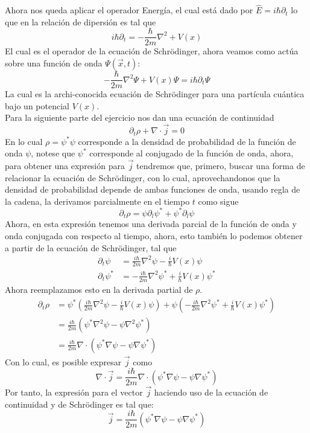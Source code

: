 \documentclass[../main_ej.tex]{subfiles}
\begin{document}
Ahora nos queda aplicar el operador Energía, el cual está dado por $\hat{E}=i\hbar\partial_t$ lo que en la relación de dipersión es tal que
\begin{equation*}
  i\hbar \partial_t = -\frac{\hbar}{2m}\nabla^2 + V(x)
\end{equation*}
El cual es el operador de la ecuación de Schrödinger, ahora veamos como actúa sobre una función de onda $\Psi(\vec{x},t)$:
\begin{equation}
  -\frac{\hbar}{2m}\nabla^2\Psi + V(x)\Psi = i\hbar \partial_t\Psi 
\end{equation}
La cual es la archi-conocida ecuación de Schrödinger para una partícula cuántica bajo un potencial $V(x)$. \\
Para la siguiente parte del ejercicio nos dan una ecuación de continuidad 
\begin{equation*}
  \partial_t\rho + \nabla \cdot \vec{j} = 0
\end{equation*}
En lo cual $\rho=\psi^*\psi$ corresponde a la densidad de probabilidad de la función de onda $\psi$, notese que $\psi^*$ corresponde al conjugado de la función de onda, ahora, para obtener una expresión para $\vec{j}$ tendremos que, primero, buscar una forma de relacionar la ecuación de Schrödinger, con lo cual, aprovechandonos que la densidad de probabilidad depende de ambas funciones de onda, usando regla de la cadena, la derivamos parcialmente en el tiempo $t$ como sigue 
\begin{equation*}
  \partial_t\rho = \psi\partial_l\psi^* + \psi^*\partial_l\psi  
\end{equation*}
Ahora, en esta expresión tenemos una derivada parcial de la función de onda y onda conjugada con respecto al tiempo, ahora, esto también lo podemos obtener a partir de la ecuación de Schrödinger, tal que
\begin{align*}
  \partial_t \psi & = \frac{i\hbar}{2m}\nabla^2 \psi -\frac{i}{\hbar}V(x)\psi \\ 
  \partial_t \psi^* & = -\frac{i\hbar}{2m}\nabla^2 \psi^* +\frac{i}{\hbar}V(x)\psi^* 
\end{align*}
Ahora reemplazamos esto en la derivada partial de $\rho$.
\begin{align*}
  \partial_t\rho & = \psi^*\left(\frac{i\hbar}{2m}\nabla^2 \psi -\frac{i}{\hbar}V(x)\psi \right) + \psi \left(  -\frac{i\hbar}{2m}\nabla^2 \psi^* +\frac{i}{\hbar}V(x)\psi^* \right) \\
  & = \frac{i\hbar}{2m} \left( \psi^* \nabla^2\psi -\psi \nabla^2\psi^* \right) \\
  & = \frac{i\hbar}{2m}\nabla \cdot \left( \psi^*\nabla \psi - \psi \nabla \psi^* \right)
\end{align*}
Con lo cual, es posible expresar $\vec{j}$ como 
\begin{equation*}
  \nabla \cdot \vec{j} = \frac{i\hbar}{2m} \nabla \cdot \left( \psi^*\nabla \psi - \psi \nabla \psi^* \right)
\end{equation*}
Por tanto, la expresión para el vector $\vec{j}$ haciendo uso de la ecuación de continuidad y de Schrödinger es tal que:
\begin{equation}
  \vec{j} = \frac{i\hbar}{2m}\left( \psi^*\nabla \psi - \psi\nabla \psi^* \right)
\end{equation}
\end{document}

